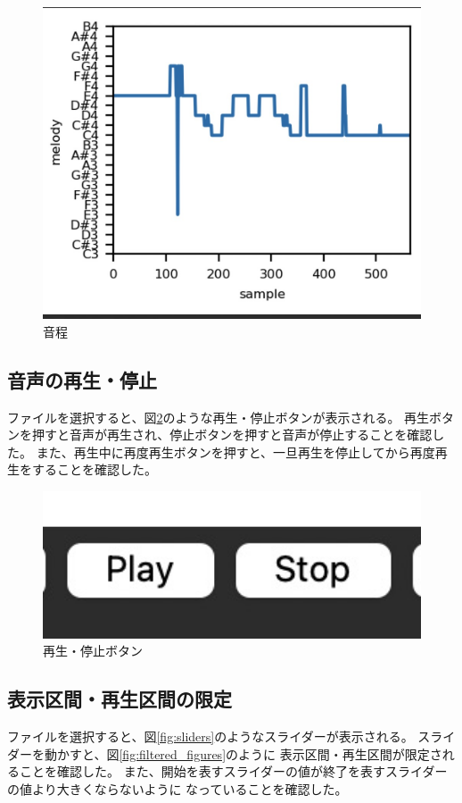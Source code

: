 \documentclass[a4paper,11pt]{jsarticle}
\begin{document}
\begin{figure}[h]
\centering
\includegraphics[keepaspectratio, width=13cm]
{./images/melody.jpg}
\caption{音程}
\label{fig:pitch}
\end{figure}

\subsection{音声の再生・停止}
ファイルを選択すると、図\ref{fig:play_stop_button}のような再生・停止ボタンが表示される。
再生ボタンを押すと音声が再生され、停止ボタンを押すと音声が停止することを確認した。
また、再生中に再度再生ボタンを押すと、一旦再生を停止してから再度再生をすることを確認した。

\begin{figure}[h]
\centering
\includegraphics[keepaspectratio, width=13cm]
{./images/play_stop_buttons.jpg}
\caption{再生・停止ボタン}
\label{fig:play_stop_button}
\end{figure}

\subsection{表示区間・再生区間の限定}
ファイルを選択すると、図\ref{fig:sliders}のようなスライダーが表示される。
スライダーを動かすと、図\ref{fig:filtered_figures}のように
表示区間・再生区間が限定されることを確認した。
また、開始を表すスライダーの値が終了を表すスライダーの値より大きくならないように
なっていることを確認した。
\end{document}
